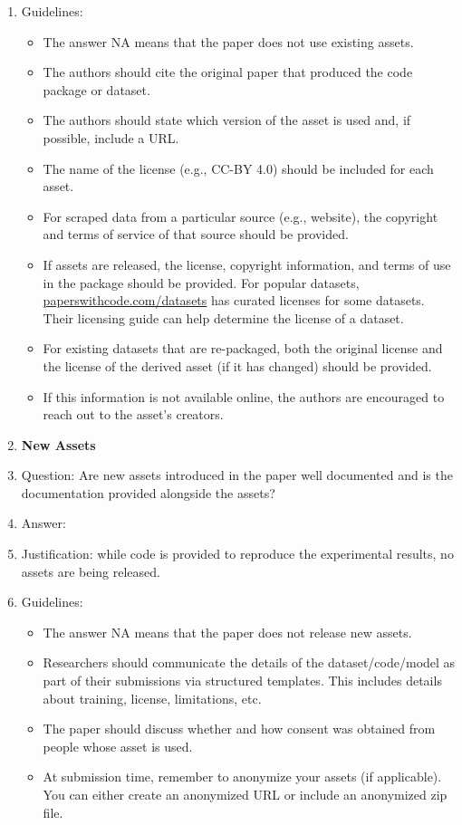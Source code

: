 \documentclass{article}
\begin{document}
\begin{enumerate}
    \item[] Guidelines:
    \begin{itemize}
        \item The answer NA means that the paper does not use existing assets.
        \item The authors should cite the original paper that produced the code package or dataset.
        \item The authors should state which version of the asset is used and, if possible, include a URL.
        \item The name of the license (e.g., CC-BY 4.0) should be included for each asset.
        \item For scraped data from a particular source (e.g., website), the copyright and terms of service of that source should be provided.
        \item If assets are released, the license, copyright information, and terms of use in the package should be provided. For popular datasets, \url{paperswithcode.com/datasets} has curated licenses for some datasets. Their licensing guide can help determine the license of a dataset.
        \item For existing datasets that are re-packaged, both the original license and the license of the derived asset (if it has changed) should be provided.
        \item If this information is not available online, the authors are encouraged to reach out to the asset's creators.
    \end{itemize}

\item {\bf New Assets}
    \item[] Question: Are new assets introduced in the paper well documented and is the documentation provided alongside the assets?
    \item[] Answer: \answerNA{} %
    \item[] Justification: while code is provided to reproduce the experimental results, no assets are being released.
    \item[] Guidelines:
    \begin{itemize}
        \item The answer NA means that the paper does not release new assets.
        \item Researchers should communicate the details of the dataset/code/model as part of their submissions via structured templates. This includes details about training, license, limitations, etc. 
        \item The paper should discuss whether and how consent was obtained from people whose asset is used.
        \item At submission time, remember to anonymize your assets (if applicable). You can either create an anonymized URL or include an anonymized zip file.
    \end{itemize}


\end{enumerate}
\end{document}
